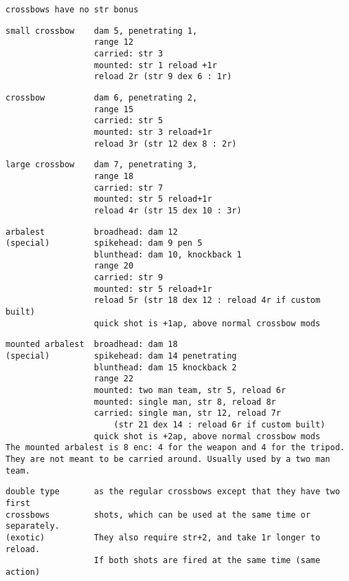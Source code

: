 \begin{samepage}
\begin{verbatim}
crossbows have no str bonus
\end{verbatim} \blocklistgap \begin{verbatim}
small crossbow    dam 5, penetrating 1,
                  range 12
                  carried: str 3
                  mounted: str 1 reload +1r
                  reload 2r (str 9 dex 6 : 1r)
\end{verbatim} \blocklistgap \begin{verbatim}
crossbow          dam 6, penetrating 2,
                  range 15
                  carried: str 5
                  mounted: str 3 reload+1r
                  reload 3r (str 12 dex 8 : 2r)
\end{verbatim} \blocklistgap \begin{verbatim}
large crossbow    dam 7, penetrating 3,
                  range 18
                  carried: str 7
                  mounted: str 5 reload+1r
                  reload 4r (str 15 dex 10 : 3r)
\end{verbatim} \blocklistgap \begin{verbatim}
arbalest          broadhead: dam 12
(special)         spikehead: dam 9 pen 5
                  blunthead: dam 10, knockback 1
                  range 20
                  carried: str 9
                  mounted: str 5 reload+1r
                  reload 5r (str 18 dex 12 : reload 4r if custom built)
                  quick shot is +1ap, above normal crossbow mods
\end{verbatim} \blocklistgap \begin{verbatim}
mounted arbalest  broadhead: dam 18
(special)         spikehead: dam 14 penetrating
                  blunthead: dam 15 knockback 2
                  range 22
                  mounted: two man team, str 5, reload 6r
                  mounted: single man, str 8, reload 8r
                  carried: single man, str 12, reload 7r
                      (str 21 dex 14 : reload 6r if custom built)
                  quick shot is +2ap, above normal crossbow mods
The mounted arbalest is 8 enc: 4 for the weapon and 4 for the tripod.
They are not meant to be carried around. Usually used by a two man team.
\end{verbatim} \blocklistgap \begin{verbatim}
double type       as the regular crossbows except that they have two first
crossbows         shots, which can be used at the same time or separately.
(exotic)          They also require str+2, and take 1r longer to reload.
                  If both shots are fired at the same time (same action)

\end{verbatim}
\end{samepage}
